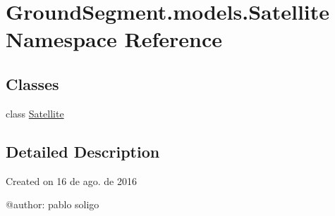 \hypertarget{namespace_ground_segment_1_1models_1_1_satellite}{}\section{Ground\+Segment.\+models.\+Satellite Namespace Reference}
\label{namespace_ground_segment_1_1models_1_1_satellite}
\subsection*{Classes}
\begin{DoxyCompactItemize}
\item 
class \hyperlink{class_ground_segment_1_1models_1_1_satellite_1_1_satellite}{Satellite}
\end{DoxyCompactItemize}


\subsection{Detailed Description}
\begin{DoxyVerb}Created on 16 de ago. de 2016

@author: pablo soligo
\end{DoxyVerb}
 